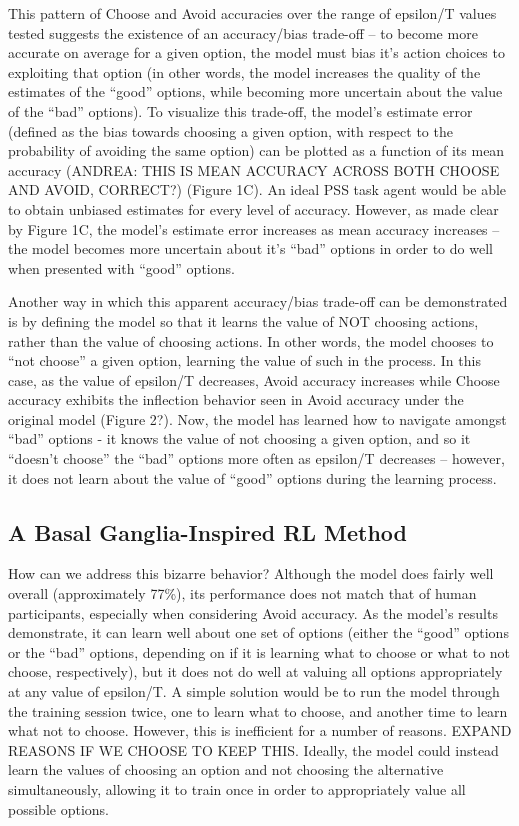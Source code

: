 \documentclass[10pt,letterpaper]{article}
\begin{document}
This pattern of Choose and Avoid accuracies over the range of epsilon/T values tested suggests the existence of an accuracy/bias trade-off – to become more accurate on average for a given option, the model must bias it’s action choices to exploiting that option (in other words, the model increases the quality of the estimates of the “good” options, while becoming more uncertain about the value of the “bad” options). To visualize this trade-off, the model’s estimate error (defined as the bias towards choosing a given option, with respect to the probability of avoiding the same option) can be plotted as a function of its mean accuracy (ANDREA: THIS IS MEAN ACCURACY ACROSS BOTH CHOOSE AND AVOID, CORRECT?) (Figure 1C). An ideal PSS task agent would be able to obtain unbiased estimates for every level of accuracy. However, as made clear by Figure 1C, the model’s estimate error increases as mean accuracy increases – the model becomes more uncertain about it’s “bad” options in order to do well when presented with “good” options.
	
Another way in which this apparent accuracy/bias trade-off can be demonstrated is by defining the model so that it learns the value of NOT choosing actions, rather than the value of choosing actions. In other words, the model chooses to “not choose” a given option, learning the value of such in the process. In this case, as the value of epsilon/T decreases, Avoid accuracy increases while Choose accuracy exhibits the inflection behavior seen in Avoid accuracy under the original model (Figure 2?). Now, the model has learned how to navigate amongst “bad” options - it knows the value of not choosing a given option, and so it “doesn’t choose” the “bad” options more often as epsilon/T  decreases – however, it does not learn about the value of “good” options during the learning process.

\subsection{A Basal Ganglia-Inspired RL Method}

How can we address this bizarre behavior? Although the model does fairly well overall (approximately 77\%), its performance does not match that of human participants, especially when considering Avoid accuracy. As the model’s results demonstrate, it can learn well about one set of options (either the “good” options or the “bad” options, depending on if it is learning what to choose or what to not choose, respectively), but it does not do well at valuing all options appropriately at any value of epsilon/T. A simple solution would be to run the model through the training session twice, one to learn what to choose, and another time to learn what not to choose. However, this is inefficient for a number of reasons. EXPAND REASONS IF WE CHOOSE TO KEEP THIS. Ideally, the model could instead learn the values of choosing an option and not choosing the alternative simultaneously, allowing it to train once in order to appropriately value all possible options. 
\end{document}
